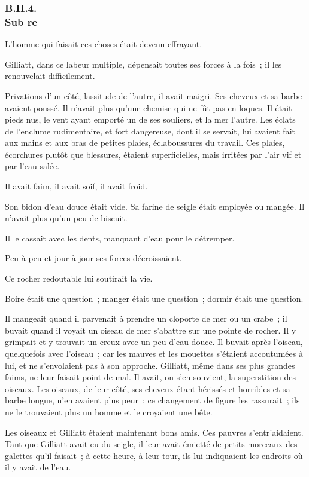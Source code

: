\documentclass[french,twoside]{book} %
\begin{document}
 \subsubsection[{B.II.4. Sub re}]{B.II.4. \\
Sub re}
\noindent L’homme qui faisait ces choses était devenu effrayant.\par
Gilliatt, dans ce labeur multiple, dépensait toutes ses forces à la fois ; il les renouvelait difficilement.\par
Privations d’un côté, lassitude de l’autre, il avait maigri. Ses cheveux et sa barbe avaient poussé. Il n’avait plus qu’une chemise qui ne fût pas en loques. Il était pieds nus, le vent ayant emporté un de ses souliers, et la mer l’autre. Les éclats de l’enclume rudimentaire, et fort dangereuse, dont il se servait, lui avaient fait aux mains et aux bras de petites plaies, éclaboussures du travail. Ces plaies, écorchures plutôt que blessures, étaient superficielles, mais irritées par l’air vif et par l’eau salée.\par
Il avait faim, il avait soif, il avait froid.\par
Son bidon d’eau douce était vide. Sa farine de seigle était employée ou mangée. Il n’avait plus qu’un peu de biscuit.\par
 Il le cassait avec les dents, manquant d’eau pour le détremper.\par
Peu à peu et jour à jour ses forces décroissaient.\par
Ce rocher redoutable lui soutirait la vie.\par
Boire était une question ; manger était une question ; dormir était une question.\par
Il mangeait quand il parvenait à prendre un cloporte de mer ou un crabe ; il buvait quand il voyait un oiseau de mer s’abattre sur une pointe de rocher. Il y grimpait et y trouvait un creux avec un peu d’eau douce. Il buvait après l’oiseau, quelquefois avec l’oiseau ; car les mauves et les mouettes s’étaient accoutumées à lui, et ne s’envolaient pas à son approche. Gilliatt, même dans ses plus grandes faims, ne leur faisait point de mal. Il avait, on s’en souvient, la superstition des oiseaux. Les oiseaux, de leur côté, ses cheveux étant hérissés et horribles et sa barbe longue, n’en avaient plus peur ; ce changement de figure les rassurait ; ils ne le trouvaient plus un homme et le croyaient une bête.\par
Les oiseaux et Gilliatt étaient maintenant bons amis. Ces pauvres s’entr’aidaient. Tant que Gilliatt avait eu du seigle, il leur avait émietté de petits morceaux des galettes qu’il faisait ; à cette heure, à leur tour, ils lui indiquaient les endroits où il y avait de l’eau.\par
\end{document}
